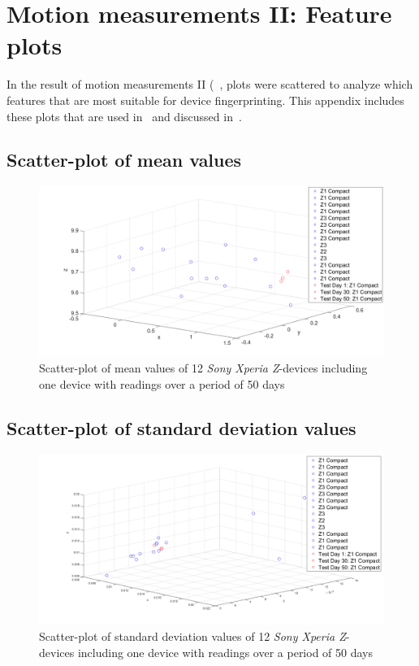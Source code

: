 \chapter{Motion measurements II: Feature plots}\label{cha:matlabFeaturesPlot}
In the result of motion measurements II (~, plots were scattered to analyze which features that are most suitable for device fingerprinting. This appendix includes these plots that are used in~ and discussed in~.

\section*{Scatter-plot of mean values}
\begin{figure}[H]
	\centering
	\includegraphics[scale=.3]{img/features/mean}
	\caption{Scatter-plot of mean values of 12  \textit{Sony Xperia Z}-devices including one device with readings over a period of 50 days}
	\label{fig:feature:mean}
\end{figure}

\section*{Scatter-plot of standard deviation values}
\begin{figure}[H]
	\centering
	\includegraphics[scale=.3]{img/features/std_dev}
	\caption{Scatter-plot of standard deviation values of 12  \textit{Sony Xperia Z}-devices including one device with readings over a period of 50 days}
	\label{fig:feature:sddev}
\end{figure}


